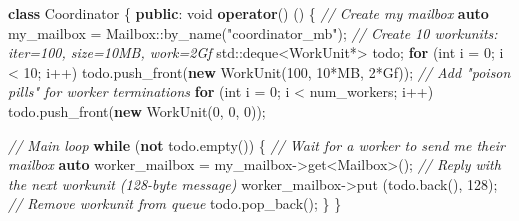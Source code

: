 \documentclass[
]{article}
\newenvironment{Shaded}{}{}
\newcommand{\BuiltInTok}[1]{\textcolor[rgb]{0.00,0.50,0.00}{#1}}
\newcommand{\CommentTok}[1]{\textcolor[rgb]{0.38,0.63,0.69}{\textit{#1}}}
\newcommand{\ControlFlowTok}[1]{\textcolor[rgb]{0.00,0.44,0.13}{\textbf{#1}}}
\newcommand{\DataTypeTok}[1]{\textcolor[rgb]{0.56,0.13,0.00}{#1}}
\newcommand{\DecValTok}[1]{\textcolor[rgb]{0.25,0.63,0.44}{#1}}
\newcommand{\KeywordTok}[1]{\textcolor[rgb]{0.00,0.44,0.13}{\textbf{#1}}}
\newcommand{\NormalTok}[1]{#1}
\newcommand{\OperatorTok}[1]{\textcolor[rgb]{0.40,0.40,0.40}{#1}}
\newcommand{\StringTok}[1]{\textcolor[rgb]{0.25,0.44,0.63}{#1}}
\begin{document}
\begin{Shaded}
\begin{Highlighting}[]
\KeywordTok{class}\NormalTok{ Coordinator }\OperatorTok{\{}
    \KeywordTok{public}\OperatorTok{:}
    \DataTypeTok{void} \KeywordTok{operator}\OperatorTok{()} \OperatorTok{()} \OperatorTok{\{}
    \CommentTok{// Create my mailbox}
    \KeywordTok{auto}\NormalTok{ my\_mailbox }\OperatorTok{=}\NormalTok{ Mailbox}\OperatorTok{::}\NormalTok{by\_name}\OperatorTok{(}\StringTok{"coordinator\_mb"}\OperatorTok{);}
    \CommentTok{// Create 10 workunits: iter=100, size=10MB, work=2Gf}
    \BuiltInTok{std::}\NormalTok{deque}\OperatorTok{\textless{}}\NormalTok{WorkUnit}\OperatorTok{*\textgreater{}}\NormalTok{ todo}\OperatorTok{;}
    \ControlFlowTok{for} \OperatorTok{(}\DataTypeTok{int}\NormalTok{ i }\OperatorTok{=} \DecValTok{0}\OperatorTok{;}\NormalTok{ i }\OperatorTok{\textless{}} \DecValTok{10}\OperatorTok{;}\NormalTok{ i}\OperatorTok{++)}
\NormalTok{    todo}\OperatorTok{.}\NormalTok{push\_front}\OperatorTok{(}\KeywordTok{new}\NormalTok{ WorkUnit}\OperatorTok{(}\DecValTok{100}\OperatorTok{,} \DecValTok{10}\OperatorTok{*}\NormalTok{MB}\OperatorTok{,} \DecValTok{2}\OperatorTok{*}\NormalTok{Gf}\OperatorTok{));}
    \CommentTok{// Add "poison pills" for worker terminations}
    \ControlFlowTok{for} \OperatorTok{(}\DataTypeTok{int}\NormalTok{ i }\OperatorTok{=} \DecValTok{0}\OperatorTok{;}\NormalTok{ i }\OperatorTok{\textless{}}\NormalTok{ num\_workers}\OperatorTok{;}\NormalTok{ i}\OperatorTok{++)}
\NormalTok{    todo}\OperatorTok{.}\NormalTok{push\_front}\OperatorTok{(}\KeywordTok{new}\NormalTok{ WorkUnit}\OperatorTok{(}\DecValTok{0}\OperatorTok{,} \DecValTok{0}\OperatorTok{,} \DecValTok{0}\OperatorTok{));}

    \CommentTok{// Main loop}
    \ControlFlowTok{while} \OperatorTok{(}\KeywordTok{not}\NormalTok{ todo}\OperatorTok{.}\NormalTok{empty}\OperatorTok{())} \OperatorTok{\{}
    \CommentTok{// Wait for a worker to send me their mailbox}
    \KeywordTok{auto}\NormalTok{ worker\_mailbox }\OperatorTok{=}\NormalTok{ my\_mailbox}\OperatorTok{{-}\textgreater{}}\NormalTok{get}\OperatorTok{\textless{}}\NormalTok{Mailbox}\OperatorTok{\textgreater{}();}
    \CommentTok{// Reply with the next workunit (128{-}byte message)}
\NormalTok{    worker\_mailbox}\OperatorTok{{-}\textgreater{}}\NormalTok{put }\OperatorTok{(}\NormalTok{todo}\OperatorTok{.}\NormalTok{back}\OperatorTok{(),} \DecValTok{128}\OperatorTok{);}
    \CommentTok{// Remove workunit from queue}
\NormalTok{    todo}\OperatorTok{.}\NormalTok{pop\_back}\OperatorTok{();}
    \OperatorTok{\}}
\OperatorTok{\}} 
\end{Highlighting}
\end{Shaded}
\end{document}
